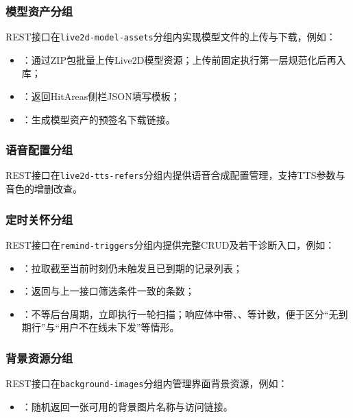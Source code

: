 \documentclass{base}
\begin{document}
\subsubsection*{模型资产分组}
REST接口在\texttt{live2d-model-assets}分组内实现模型文件的上传与下载，例如：
\begin{itemize}\setlength{\itemsep}{2pt}\setlength{\parsep}{0pt}
    \item {}：通过ZIP包批量上传Live2D模型资源；上传前固定执行第一层规范化后再入库；
    \item {}：返回HitAreas侧栏JSON填写模板；
    \item {}：生成模型资产的预签名下载链接。
\end{itemize}

\subsubsection*{语音配置分组}
REST接口在\texttt{live2d-tts-refers}分组内提供语音合成配置管理，支持TTS参数与音色的增删改查。

\subsubsection*{定时关怀分组}
REST接口在\texttt{remind-triggers}分组内提供完整CRUD及若干诊断入口，例如：
\begin{itemize}\setlength{\itemsep}{2pt}\setlength{\parsep}{0pt}
    \item {}：拉取截至当前时刻仍未触发且已到期的记录列表；
    \item {}：返回与上一接口筛选条件一致的条数；
    \item {}：不等后台周期，立即执行一轮扫描；响应体中带、、等计数，便于区分``无到期行''与``用户不在线未下发''等情形。
\end{itemize}

\subsubsection*{背景资源分组}
REST接口在\texttt{background-images}分组内管理界面背景资源，例如：
\begin{itemize}\setlength{\itemsep}{2pt}\setlength{\parsep}{0pt}
    \item {}：随机返回一张可用的背景图片名称与访问链接。
\end{itemize}
\end{document}
